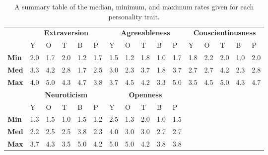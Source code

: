 \begin{table}[hbt!]
    \renewcommand{\arraystretch}{1}
    \begin{center}
        \begin{tabular}{p{}|
        p{}|p{}|p{}|p{}|p{}||
        p{}|p{}|p{}|p{}|p{}||
        p{}|p{}|p{}|p{}|p{}|}
            \cline{2-16}
            & \multicolumn{5}{c||}{\textbf{Extraversion}} & \multicolumn{5}{c||}{\textbf{Agreeableness}}
            & \multicolumn{5}{c|}{\textbf{Conscientiousness}} \\
            \cline{2-16}
            & Y & O & T & B & P & Y & O & T & B & P & Y & O & T & B & P     \\
            \cline{2-16}
            \textbf{Min}    & 2.0 & 1.7 & 2.0 & 1.2 & 1.7 & 1.5 & 1.2 & 1.8 & 1.0 & 1.7 & 1.8 & 2.2 & 2.0 & 1.0 & 2.0  \\
            \textbf{Med}    & 3.3 & 4.2 & 2.8 & 1.7 & 2.5 & 3.0 & 2.3 & 3.7 & 1.8 & 3.7 & 2.7 & 2.7 & 4.2 & 2.3 & 2.8  \\
            \textbf{Max}    & 4.0 & 5.0 & 4.3 & 4.7 & 3.8 & 3.7 & 4.5 & 4.2 & 3.3 & 5.0 & 3.5 & 4.5 & 5.0 & 4.3 & 4.7 \\
            \cline{2-16}
            \cline{2-11}
            &  \multicolumn{5}{|c||}{\textbf{Neuroticism}} & \multicolumn{5}{|c||}{\textbf{Openness}} \\
            \cline{2-11}
            & Y & O & T & B & P & Y & O & T & B & P            \\
            \cline{2-11}
            \textbf{Min}    & 1.3 & 1.5 & 1.0 & 1.5 & 1.2 & 2.5 & 1.3 & 2.0 & 1.0 & 1.5    \\
            \textbf{Med}    & 2.2 & 2.5 & 2.5 & 3.8 & 2.3 & 4.0 & 3.0 & 3.0 & 2.7 & 2.7    \\
            \textbf{Max}    & 3.7 & 4.3 & 3.5 & 5.0 & 4.2 & 5.0 & 5.0 & 4.2 & 3.8 & 3.8    \\
            \cline{2-11}
        \end{tabular}
        \caption[]{A summary table of the median, minimum, and maximum rates given for each personality trait.\footnotemark}
        \label{table:medianMT1}
    \end{center}
\end{table}

